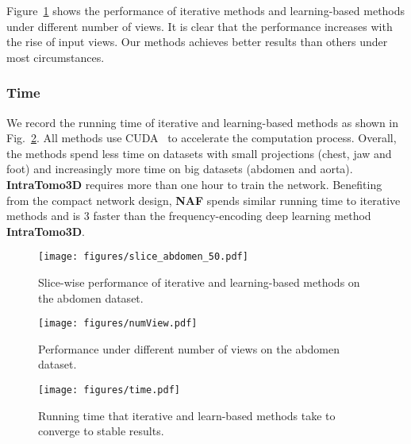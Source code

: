 \documentclass[runningheads]{llncs}
\begin{document}
Figure~\ref{fig:numView} shows the performance of iterative methods and learning-based methods under different number of views. It is clear that the performance increases with the rise of input views. Our methods achieves better results than others under most circumstances.


\subsubsection{Time} We record the running time of iterative and learning-based methods as shown in Fig.~\ref{fig:time}. All methods use CUDA~\cite{cuda} to accelerate the computation process. Overall, the methods spend less time on datasets with small projections (chest, jaw and foot) and increasingly more time on big datasets (abdomen and aorta). \textbf{IntraTomo3D} requires more than one hour to train the network. Benefiting from the compact network design, \textbf{NAF} spends similar running time to iterative methods and is 3 faster than the frequency-encoding deep learning method \textbf{IntraTomo3D}.


\begin{figure}[t]
\centering
\begin{minipage}[t]{0.47\linewidth}
\centering
\texttt{[image: figures/slice\_abdomen\_50.pdf]}
\caption{Slice-wise performance of iterative and learning-based methods on the abdomen dataset.}
 \label{fig:slice}
\end{minipage}
\hspace{4mm}
\begin{minipage}[t]{0.47\linewidth}
\centering
\texttt{[image: figures/numView.pdf]}
\caption{Performance under different number of views on the abdomen dataset.}
 \label{fig:numView}
\end{minipage}
\vspace{-1em}
\end{figure}

\begin{figure}[t]
    \centering
    \texttt{[image: figures/time.pdf]}
    \caption{Running time that iterative and learn-based methods take to converge to stable results.}
    \label{fig:time}
\end{figure}
\end{document}

